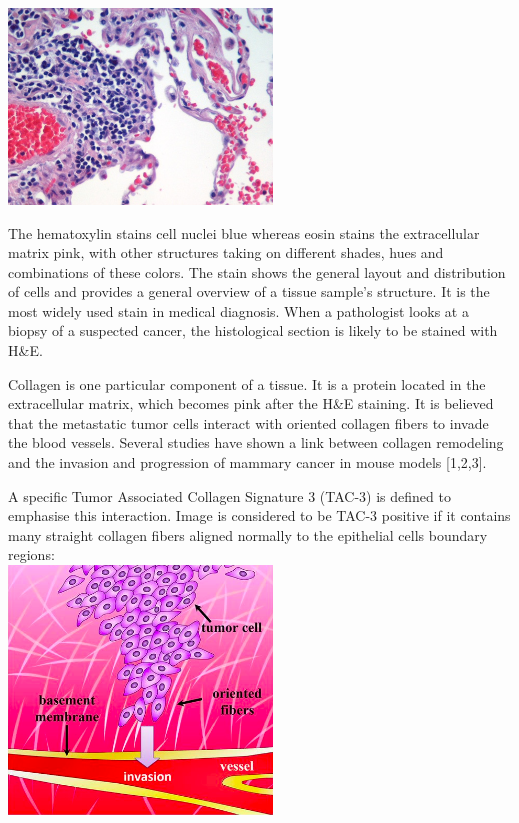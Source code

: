 \documentclass{article}
\begin{document}
\includegraphics[width=7cm]{images/example.jpg}

The hematoxylin stains cell nuclei blue whereas eosin
stains the extracellular matrix pink, with other structures taking on
different shades, hues and combinations of these colors. The stain shows
the general layout and distribution of cells and provides a general
overview of a tissue sample's structure. It is the most widely used stain
in medical diagnosis. When a pathologist looks at a biopsy of a suspected
cancer, the histological section is likely to be stained with H\&E.

Collagen is one particular component of a tissue. It is a protein located
in the extracellular matrix, which becomes pink after the H\&E staining.
It is believed that the metastatic tumor cells interact with oriented
collagen fibers to invade the blood vessels. Several studies have shown a link between collagen remodeling and the invasion and progression of mammary cancer in mouse models [1,2,3].

A specific Tumor Associated
Collagen Signature 3 (TAC-3) is defined to emphasise this interaction. Image
is considered to be TAC-3 positive if it contains many straight collagen
fibers aligned normally to the epithelial cells boundary regions: \\

\includegraphics[width=7cm]{images/tac3.png}
\end{document}

